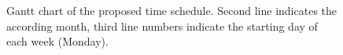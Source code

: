 \begin{figure} [!h]
{\begin{ganttchart}{1}{31}
       \\
       \\
    \end{ganttchart}
  }
  \caption{Gantt chart of the proposed time schedule. Second line indicates the according month, third line numbers indicate the starting day of each week (Monday).}
  \label{fig:schedule}
\end{figure}
